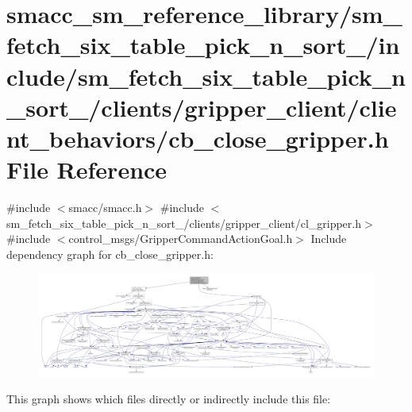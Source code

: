 \hypertarget{sm__fetch__six__table__pick__n__sort__1_2include_2sm__fetch__six__table__pick__n__sort__1_2clien8eb92a71a3a41c2fe177e1824517dc62}{}\section{smacc\+\_\+sm\+\_\+reference\+\_\+library/sm\+\_\+fetch\+\_\+six\+\_\+table\+\_\+pick\+\_\+n\+\_\+sort\+\_/include/sm\+\_\+fetch\+\_\+six\+\_\+table\+\_\+pick\+\_\+n\+\_\+sort\+\_/clients/gripper\+\_\+client/client\+\_\+behaviors/cb\+\_\+close\+\_\+gripper.h File Reference}
\label{sm__fetch__six__table__pick__n__sort__1_2include_2sm__fetch__six__table__pick__n__sort__1_2clien8eb92a71a3a41c2fe177e1824517dc62}
{\ttfamily \#include $<$smacc/smacc.\+h$>$}\newline
{\ttfamily \#include $<$sm\+\_\+fetch\+\_\+six\+\_\+table\+\_\+pick\+\_\+n\+\_\+sort\+\_/clients/gripper\+\_\+client/cl\+\_\+gripper.\+h$>$}\newline
{\ttfamily \#include $<$control\+\_\+msgs/\+Gripper\+Command\+Action\+Goal.\+h$>$}\newline
Include dependency graph for cb\+\_\+close\+\_\+gripper.\+h\+:
\nopagebreak
\begin{figure}[H]
\begin{center}
\leavevmode
\includegraphics[width=350pt]{sm__fetch__six__table__pick__n__sort__1_2include_2sm__fetch__six__table__pick__n__sort__1_2clien5dd3a212ef80dc6e673368bfb492d639}
\end{center}
\end{figure}
This graph shows which files directly or indirectly include this file\+:
